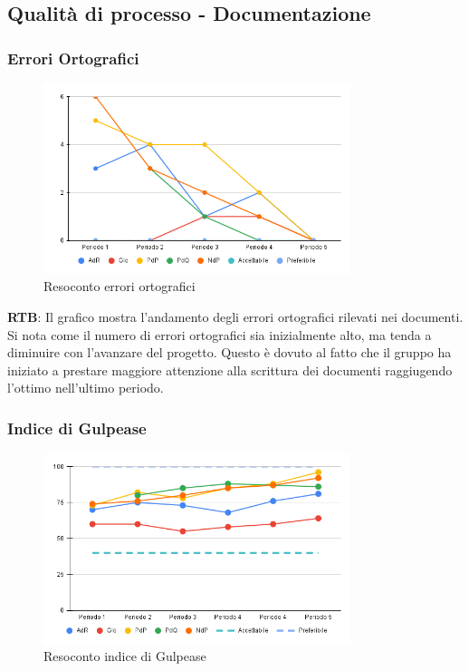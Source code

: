 \subsection{Qualità di processo - Documentazione}

\subsubsection{Errori Ortografici}
\begin{figure}[H]
    \centering
    \includegraphics[width=0.8\textwidth]{../Images/PianoDiQualifica/errori_ortografici.png}
    \caption{Resoconto errori ortografici}
    \label{fig:Errori ortografici}
\end{figure}

\textbf{RTB}: Il grafico mostra l'andamento degli errori ortografici rilevati nei documenti. Si nota come il numero di errori ortografici sia inizialmente alto, ma tenda a diminuire con l'avanzare del progetto. Questo è dovuto al fatto che il gruppo ha iniziato a prestare maggiore attenzione alla scrittura dei documenti raggiugendo l'ottimo nell'ultimo periodo.

\subsubsection{Indice di Gulpease}
\begin{figure}[H]
    \centering
    \includegraphics[width=0.8\textwidth]{../Images/PianoDiQualifica/Gulpease.png}
    \caption{Resoconto indice di Gulpease}
    \label{fig:Indice di Gulpease}
\end{figure}

